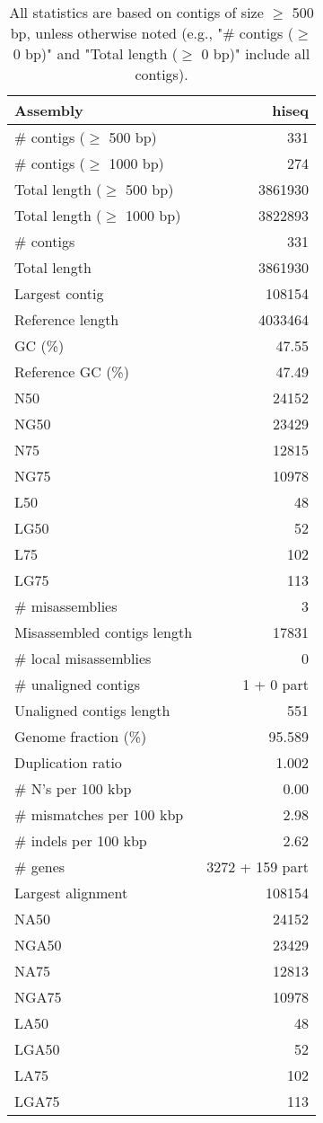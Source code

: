 \documentclass[12pt,a4paper]{article}
\begin{document}
\begin{table}[ht]
\begin{center}
\caption{All statistics are based on contigs of size $\geq$ 500 bp, unless otherwise noted (e.g., "\# contigs ($\geq$ 0 bp)" and "Total length ($\geq$ 0 bp)" include all contigs).}
\begin{tabular}{|l*{1}{|r}|}
\hline
Assembly & hiseq \\ \hline
\# contigs ($\geq$ 500 bp) & 331 \\ \hline
\# contigs ($\geq$ 1000 bp) & 274 \\ \hline
Total length ($\geq$ 500 bp) & 3861930 \\ \hline
Total length ($\geq$ 1000 bp) & 3822893 \\ \hline
\# contigs & 331 \\ \hline
Total length & 3861930 \\ \hline
Largest contig & 108154 \\ \hline
Reference length & 4033464 \\ \hline
GC (\%) & 47.55 \\ \hline
Reference GC (\%) & 47.49 \\ \hline
N50 & 24152 \\ \hline
NG50 & 23429 \\ \hline
N75 & 12815 \\ \hline
NG75 & 10978 \\ \hline
L50 & 48 \\ \hline
LG50 & 52 \\ \hline
L75 & 102 \\ \hline
LG75 & 113 \\ \hline
\# misassemblies & 3 \\ \hline
Misassembled contigs length & 17831 \\ \hline
\# local misassemblies & 0 \\ \hline
\# unaligned contigs & 1 + 0 part \\ \hline
Unaligned contigs length & 551 \\ \hline
Genome fraction (\%) & 95.589 \\ \hline
Duplication ratio & 1.002 \\ \hline
\# N's per 100 kbp & 0.00 \\ \hline
\# mismatches per 100 kbp & 2.98 \\ \hline
\# indels per 100 kbp & 2.62 \\ \hline
\# genes & 3272 + 159 part \\ \hline
Largest alignment & 108154 \\ \hline
NA50 & 24152 \\ \hline
NGA50 & 23429 \\ \hline
NA75 & 12813 \\ \hline
NGA75 & 10978 \\ \hline
LA50 & 48 \\ \hline
LGA50 & 52 \\ \hline
LA75 & 102 \\ \hline
LGA75 & 113 \\ \hline
\end{tabular}
\end{center}
\end{table}
\end{document}
